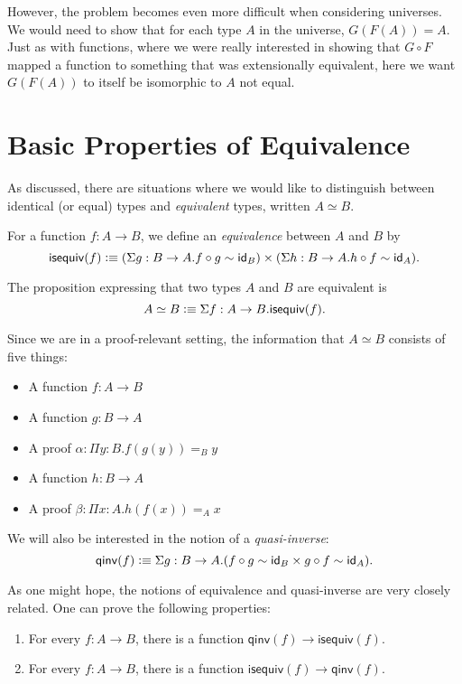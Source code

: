 \documentclass[12pt]{article}
\newcommand{\iseq}{\mathsf{isequiv}}
\newcommand{\qinv}{\mathsf{qinv}}
\newcommand*{\comp}{\mathbin{\circ}}
\begin{document}
However, the problem becomes even more difficult when considering universes.
We would need to show that for each type $A$ in the universe, $G(F(A)) = A$.
Just as with functions, where we were really interested in showing that $G
\circ F$ mapped a function to something that was extensionally equivalent, here
we want $G(F(A))$ to itself be isomorphic to $A$ not equal.

\section{Basic Properties of Equivalence}\label{sec:equiv}

As discussed, there are situations where we would like to distinguish between 
identical (or equal) types and \emph{equivalent} types, written $A\simeq B$.


 For a function $f:A \to B$, we define an \emph{equivalence} between $A$ and $B$ by
  $$\iseq(f)\defeq (\Sigma g: B\to A.f\comp g \sim \id_B)\times (\Sigma h: B\to A.h\comp f \sim \id_A).$$
  
 The proposition expressing that two types $A$ and $B$ are equivalent is
  $$A\simeq B\defeq \Sigma f: A\to B.\iseq(f).$$
  
Since we are in a proof-relevant setting, the information that $A\simeq B$ 
consists of five things:
\begin{itemize}
 \item A function $f:A\to B$
 \item A function $g: B\to A$
 \item A proof $\alpha: \Pi y:B.f(g(y)) =_B y$
 \item A function $h: B\to A$
 \item A proof $\beta: \Pi x:A.h(f(x)) =_A x$
\end{itemize}
  
 We will also be interested in the notion of a \emph{quasi-inverse}:
  $$\qinv(f)\defeq \Sigma g:B\to A.(f\comp g\sim \id_B \times g\comp f\sim \id_A).$$
  
As one might hope, the notions of equivalence and quasi-inverse are very closely related.
One can prove the following properties:

\begin{enumerate}
 \item For every $f:A\to B$, there is a function $\qinv(f) \to \iseq(f)$.
 \item For every $f:A\to B$, there is a function $\iseq(f) \to \qinv(f)$.
\end{enumerate}
\end{document}
